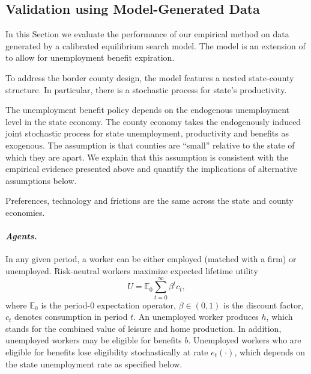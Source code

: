 \documentclass[12pt]{article}
\newcommand{\1}{\mathbf{1}}
\newcommand{\E}{\mathbb{E}}
\begin{document}
\begin{appendix}
\section{Validation using Model-Generated Data}
\label{sec:simulation}

In this Section we evaluate the performance of our empirical method on data generated by a calibrated equilibrium search model. The model is an extension of \citet{mortensen+pissarides:94} to allow for unemployment benefit expiration.

To address the border county design, the model features a nested state-county structure. In particular, there is a stochastic process for state's productivity.

 The unemployment benefit policy depends on the endogenous unemployment level in the state economy.  The county economy takes the endogenously induced joint stochastic process for state unemployment, productivity and benefits as exogenous. The assumption is that counties are ``small'' relative to the state of which they are apart. We explain that this assumption is consistent with the empirical evidence presented above and quantify the implications of alternative assumptions below.

Preferences, technology and frictions are the same across the state and county economies.

\vspace{-0.4cm}\paragraph{\textit{Agents.}} In any given period, a worker can be either employed (matched with a firm) or unemployed. Risk-neutral workers maximize expected lifetime utility
\begin{equation*}
U=\E_0 \sum\limits_{t=0}^{\infty} \beta^t c_t,
\end{equation*}
where $\E_0$ is the period-0 expectation operator, $\beta \in \left(0,1\right)$ is the discount factor, $c_t$ denotes consumption in period $t$.  An unemployed worker produces $h$, which stands for the combined value of leisure and home production.  In addition, unemployed workers may be eligible for benefits $b$.  Unemployed workers who are eligible for benefits lose eligibility stochastically at rate $e_t(\cdot)$, which depends on the state unemployment rate as specified below.


\end{appendix}
\end{document}
